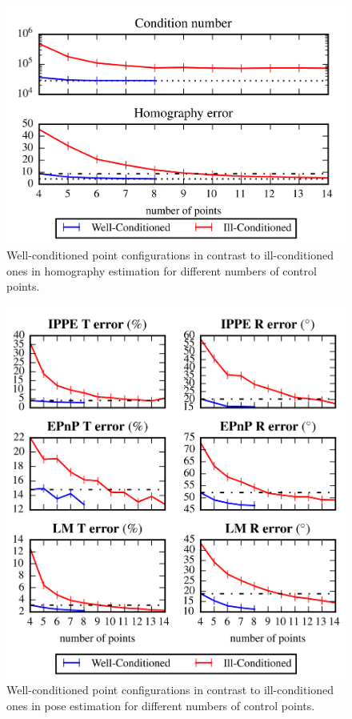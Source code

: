 \documentclass[letterpaper, 10 pt, conference]{ieeeconf}  %
\begin{document}
	\begin{figure}[t]
		\begin{center}
			\includegraphics[width=\columnwidth]{img/point_config_comp_homo.png}
			\caption{\label{fig:comp_homo}\small Well-conditioned point configurations in contrast to ill-conditioned ones in homography estimation for different numbers of control points.}
		\end{center}
		\vspace{-0.5cm}
	\end{figure}
	
	
	\begin{figure}[t]
		\begin{center}
			\includegraphics[width=\columnwidth]{img/point_config_comp_pose.png}
			\caption{\label{fig:comp_pose}\small Well-conditioned point configurations in contrast to ill-conditioned ones in pose estimation for different numbers of control points.}
		\end{center}
		\vspace{-0.5cm}
	\end{figure}
	
\end{document}
